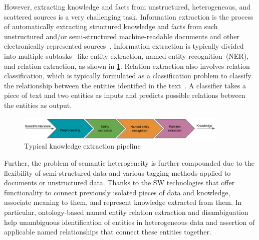 However, extracting knowledge and facts from unstructured, heterogeneous, and scattered sources is a very challenging task. Information extraction is the process of automatically extracting structured knowledge and facts from such unstructured and/or semi-structured machine-readable documents and other electronically represented sources~\cite{Liddy.2001}. Information extraction is typically divided into multiple subtasks~\cite{Jurafsky.2014} like entity extraction, named entity recognition~(NER), and relation extraction, as shown in \cref{fig:IE_pipeline}. Relation extraction also involves relation classification, which is typically formulated as a classification problem to classify the relationship between the entities identified in the text~\cite{xue2019fine}. A classifier takes a piece of text and two entities as inputs and predicts possible relations between the entities as output. 

\begin{figure}[h]
    \centering
    \includegraphics[width=0.9\textwidth]{images/cb_v2.png}
    \caption{Typical knowledge extraction pipeline}
    \label{fig:IE_pipeline}
\end{figure}

\hspace*{3.5mm} Further, the problem of semantic heterogeneity is further compounded due to the flexibility of semi-structured data and various tagging methods applied to documents or unstructured data. Thanks to the SW technologies that offer functionality to connect previously isolated pieces of data and knowledge, associate meaning to them, and represent knowledge extracted from them. In particular, ontology-based named entity relation extraction and disambiguation help unambiguous identification of entities in heterogeneous data and assertion of applicable named relationships that connect these entities together. 


